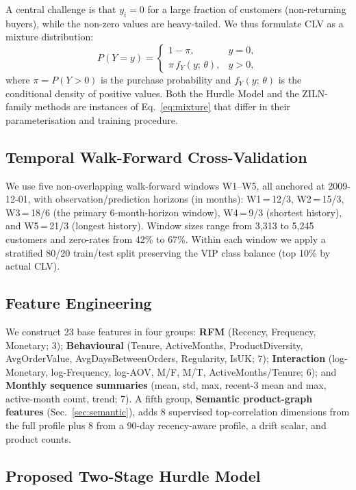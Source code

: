 \documentclass[pdflatex,sn-mathphys-num]{sn-jnl}
\theoremstyle{thmstyleone}
\theoremstyle{thmstyletwo}
\theoremstyle{thmstylethree}
\begin{document}
A central challenge is that $y_i = 0$ for a large fraction of customers
(non-returning buyers), while the non-zero values are heavy-tailed. We thus
formulate CLV as a mixture distribution:
\begin{equation}
P(Y = y) =
\begin{cases}
1 - \pi, & y = 0, \\[3pt]
\pi\, f_Y(y;\,\theta), & y > 0,
\end{cases}
\label{eq:mixture}
\end{equation}
where $\pi = P(Y > 0)$ is the purchase probability and $f_Y(y;\,\theta)$ is
the conditional density of positive values. Both the Hurdle Model and the
ZILN-family methods are instances of Eq.~\eqref{eq:mixture} that differ in
their parameterisation and training procedure.

\subsection{Temporal Walk-Forward Cross-Validation}

We use five non-overlapping walk-forward windows W1--W5, all
anchored at 2009-12-01, with observation/prediction horizons (in
months): \mbox{W1\,=\,12/3}, \mbox{W2\,=\,15/3},
\mbox{W3\,=\,18/6} (the primary 6-month-horizon window),
\mbox{W4\,=\,9/3} (shortest history), and \mbox{W5\,=\,21/3}
(longest history). Window sizes range from 3{,}313 to 5{,}245
customers and zero-rates from 42\% to 67\%. Within each window we
apply a stratified 80/20 train/test split preserving the VIP class
balance (top 10\% by actual CLV).

\subsection{Feature Engineering}

We construct 23 base features in four groups: \textbf{RFM} (Recency,
Frequency, Monetary; 3); \textbf{Behavioural} (Tenure, ActiveMonths,
ProductDiversity, AvgOrderValue, AvgDaysBetweenOrders, Regularity,
IsUK; 7); \textbf{Interaction} (log-Monetary, log-Frequency,
log-AOV, M/F, M/T, ActiveMonths/Tenure; 6); and \textbf{Monthly
sequence summaries} (mean, std, max, recent-3 mean and max,
active-month count, trend; 7). A fifth group, \textbf{Semantic
product-graph features} (Sec.~\ref{sec:semantic}), adds 8 supervised
top-correlation dimensions from the full profile plus 8 from a
90-day recency-aware profile, a drift scalar, and product counts.

\subsection{Proposed Two-Stage Hurdle Model}
\end{document}
